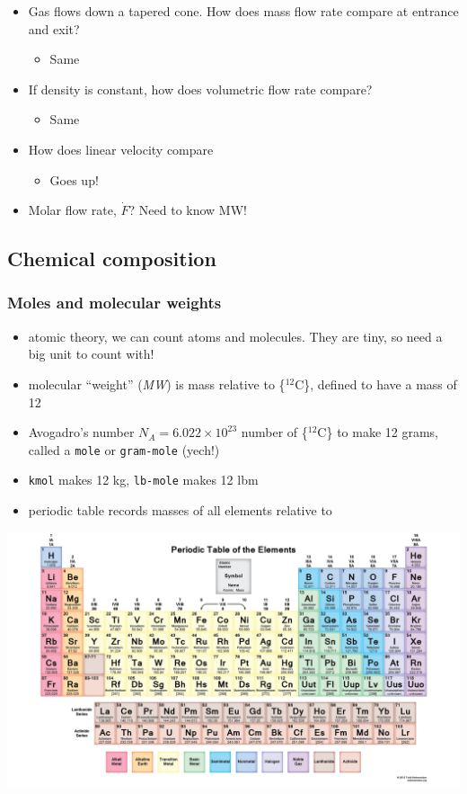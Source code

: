 \documentclass[11pt]{article}
\begin{document}
\begin{itemize}
\item Gas flows down a tapered cone.  How does mass flow rate compare at entrance and exit?
\begin{itemize}
\item Same
\end{itemize}
\item If density is constant, how does volumetric flow rate compare?
\begin{itemize}
\item Same
\end{itemize}
\item How does linear velocity compare
\begin{itemize}
\item Goes up!
\end{itemize}
\item Molar flow rate, \(\dot{F}\)?  Need to know MW!
\end{itemize}

\subsection{Chemical composition}
\label{sec-4-4}
\subsubsection{Moles and molecular weights}
\label{sec-4-4-1}
\begin{itemize}
\item atomic theory, we can count atoms and molecules.  They are tiny, so need a big unit to count with!
\item molecular ``weight'' (\emph{MW}) is mass relative to \ce\{$^{\text{12}}$C\}, defined to have a mass of 12
\item Avogadro's number \(N_{A}=6.022\times 10^{23}\) number of \ce\{$^{\text{12}}$C\} to make 12 grams, called a \texttt{mole} or \texttt{gram-mole} (yech!)
\item \texttt{kmol} makes 12 kg, \texttt{lb-mole} makes 12 lbm
\item periodic table records masses of all elements relative to 
\end{itemize}

\includegraphics[width=.9\linewidth]{./figs/PeriodicTableMuted.png}
\end{document}

